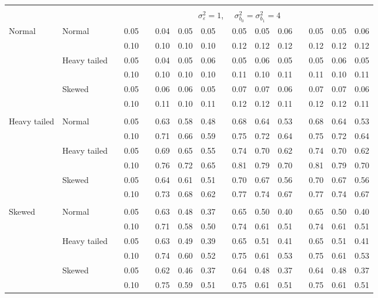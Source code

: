 \documentclass{article} %
\begin{document}
\begin{table}[ht]
\begin{scriptsize}
\begin{center}
\begin{tabular}{ll p{.1cm} c p{.1cm} rrr p{.1cm} rrr p{.1cm} rrr}
&&&&&&&&&&&&&&&\\
& && && \multicolumn{9}{c}{$\sigma_{\varepsilon}^2 = 1$, \ \ $\sigma_{b_0}^2 = \sigma_{b_1}^2 = 4$} \\ \cline{6-16}
\rowcolor{gray!20}Normal       & Normal       && 0.05 &&   0.04 & 0.05 & 0.05 && 0.05 & 0.05 & 0.06 && 0.05 & 0.05 & 0.06 \\ 
\rowcolor{gray!20}             &              && 0.10 &&   0.10 & 0.10 & 0.10 && 0.12 & 0.12 & 0.12 && 0.12 & 0.12 & 0.12 \\ 
\rowcolor{gray!20}             & Heavy tailed && 0.05 &&   0.04 & 0.05 & 0.06 && 0.05 & 0.06 & 0.05 && 0.05 & 0.06 & 0.05 \\ 
\rowcolor{gray!20}             &              && 0.10 &&   0.10 & 0.10 & 0.10 && 0.11 & 0.10 & 0.11 && 0.11 & 0.10 & 0.11 \\ 
\rowcolor{gray!20}             & Skewed       && 0.05 &&   0.06 & 0.06 & 0.05 && 0.07 & 0.07 & 0.06 && 0.07 & 0.07 & 0.06 \\ 
\rowcolor{gray!20}             &              && 0.10 &&   0.11 & 0.10 & 0.11 && 0.12 & 0.12 & 0.11 && 0.12 & 0.12 & 0.11 \\ 
             &&&&&&&&&&&&&&&\\
Heavy tailed & Normal       && 0.05 &&   0.63 & 0.58 & 0.48 && 0.68 & 0.64 & 0.53 && 0.68 & 0.64 & 0.53 \\ 
             &              && 0.10 &&   0.71 & 0.66 & 0.59 && 0.75 & 0.72 & 0.64 && 0.75 & 0.72 & 0.64 \\ 
             & Heavy tailed && 0.05 &&   0.69 & 0.65 & 0.55 && 0.74 & 0.70 & 0.62 && 0.74 & 0.70 & 0.62 \\ 
             &              && 0.10 &&   0.76 & 0.72 & 0.65 && 0.81 & 0.79 & 0.70 && 0.81 & 0.79 & 0.70 \\ 
             & Skewed       && 0.05 &&   0.64 & 0.61 & 0.51 && 0.70 & 0.67 & 0.56 && 0.70 & 0.67 & 0.56 \\ 
             &              && 0.10 &&   0.73 & 0.68 & 0.62 && 0.77 & 0.74 & 0.67 && 0.77 & 0.74 & 0.67 \\ 
             &&&&&&&&&&&&&&&\\
Skewed       & Normal       && 0.05 &&   0.63 & 0.48 & 0.37 && 0.65 & 0.50 & 0.40 && 0.65 & 0.50 & 0.40 \\ 
             &              && 0.10 &&   0.71 & 0.58 & 0.50 && 0.74 & 0.61 & 0.51 && 0.74 & 0.61 & 0.51 \\ 
             & Heavy tailed && 0.05 &&   0.63 & 0.49 & 0.39 && 0.65 & 0.51 & 0.41 && 0.65 & 0.51 & 0.41 \\ 
             &              && 0.10 &&   0.74 & 0.60 & 0.52 && 0.75 & 0.61 & 0.53 && 0.75 & 0.61 & 0.53 \\ 
             & Skewed       && 0.05 &&   0.62 & 0.46 & 0.37 && 0.64 & 0.48 & 0.37 && 0.64 & 0.48 & 0.37 \\ 
             &              && 0.10 &&   0.75 & 0.59 & 0.51 && 0.75 & 0.61 & 0.51 && 0.75 & 0.61 & 0.51 \\ 



\end{tabular}
\end{center}
\end{scriptsize}
\end{table}
\end{document}
